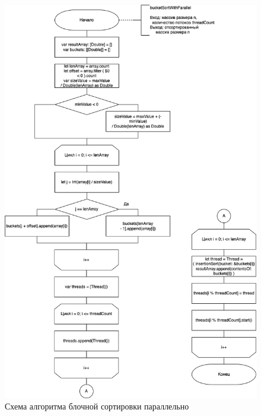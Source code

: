 \begin{figure}[h!]
	\centering
	\includegraphics[width=0.95\linewidth]{img/BucketParallel.png}
	\caption{Схема алгоритма блочной сортировки параллельно}
	\label{fig:alg2}
\end{figure}

